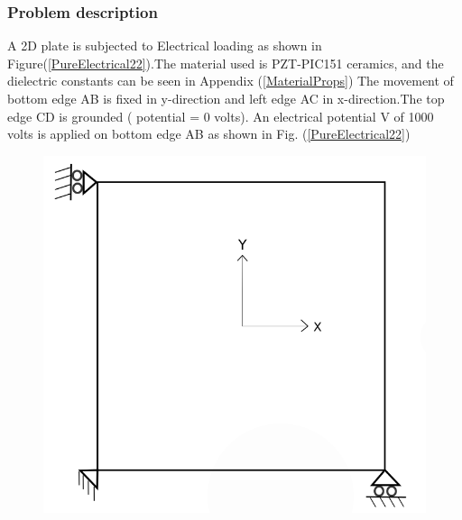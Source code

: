 \documentclass[11pt]{article}
\begin{document}
\subsubsection{Problem description}\label{2DPWPELPD}
A 2D plate is subjected to Electrical loading as shown in Figure(\ref{PureElectrical22}).The material used is PZT-PIC151 ceramics, and the dielectric constants can be seen in Appendix (\ref{MaterialProps})
The movement of bottom edge AB is fixed in y-direction and left edge AC in x-direction.The top edge CD is grounded ( potential = 0 volts). An electrical potential V of 1000 volts is applied on bottom edge AB as shown in Fig. (\ref{PureElectrical22})
\begin{figure}[H]
	\centering
	\begin{minipage}{.4\textwidth}
		\centering
		\includegraphics[width=0.8\linewidth]{2DPlate.png}
		\label{2Dplate}
	\end{minipage}%
	\begin{minipage}{.4\textwidth}
		\centering

\end{minipage}
\end{figure}
\end{document}
